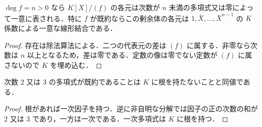 \begin{prop}[剰余環の代表元]
$\deg f=n>0$ なら $K[X]/(f)$ の各元は次数が $n$ 未満の多項式又は零によって一意に表される．特に $f$ が既約ならこの剰余体の各元は $1,\bar X,\ldots,\bar X^{n-1}$ の $K$ 係数による一意な線形結合である．
\end{prop}
\begin{proof}
存在は除法算法による．二つの代表元の差は $(f)$ に属する．非零なら次数は $n$ 以上となるため，差は零である．定数の像は零でない定数が $(f)$ に属さないので $K$ を埋め込む．
\end{proof}
\begin{prop}[低次数の既約性]
次数 $2$ 又は $3$ の多項式が既約であることは $K$ に根を持たないことと同値である．
\end{prop}
\begin{proof}
根があれば一次因子を持つ．逆に非自明な分解では因子の正の次数の和が $2$ 又は $3$ であり，一方は一次である．一次多項式は $K$ に根を持つ．
\end{proof}
